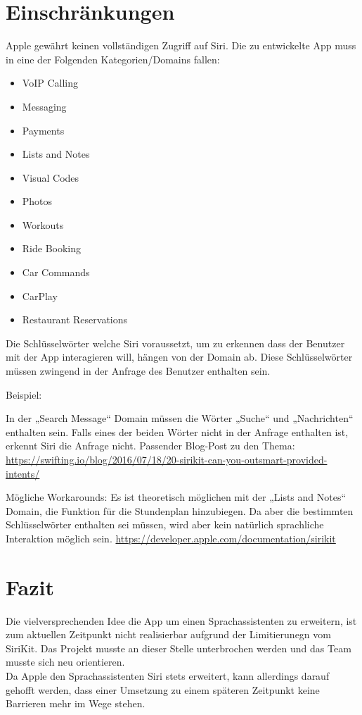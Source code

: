 \section{Einschränkungen}

Apple gewährt keinen vollständigen Zugriff auf Siri. Die zu entwickelte App muss in eine der Folgenden Kategorien/Domains fallen:
\begin{itemize}
\item VoIP Calling 
\item Messaging
\item Payments
\item Lists and Notes
\item Visual Codes
\item Photos
\item Workouts
\item Ride Booking
\item Car Commands
\item CarPlay
\item Restaurant Reservations
\end{itemize}

\newpage

Die Schlüsselwörter welche Siri voraussetzt, um zu erkennen dass der Benutzer mit der App interagieren will, hängen von der Domain ab.
Diese Schlüsselwörter müssen zwingend in der Anfrage des Benutzer enthalten sein. 

Beispiel: 

In der „Search Message“  Domain müssen die Wörter „Suche“ und „Nachrichten“ enthalten sein. Falls eines der beiden Wörter nicht in der Anfrage enthalten ist, erkennt Siri die Anfrage nicht.  \newline
Passender Blog-Post zu den Thema: \newline
\url{https://swifting.io/blog/2016/07/18/20-sirikit-can-you-outsmart-provided-intents/}

Mögliche Workarounds: \newline
Es ist theoretisch möglichen mit der „Lists and Notes“ Domain, die Funktion für die Stundenplan hinzubiegen. Da aber die bestimmten Schlüsselwörter enthalten sei müssen, wird aber kein natürlich sprachliche Interaktion möglich sein.
\url{https://developer.apple.com/documentation/sirikit}

\section{Fazit}
Die vielversprechenden Idee die App um einen Sprachassistenten zu erweitern, ist zum aktuellen Zeitpunkt nicht realisierbar aufgrund der Limitierunegn vom SiriKit. Das Projekt musste an dieser Stelle unterbrochen werden und das Team musste sich neu orientieren.\\
Da Apple den Sprachassistenten Siri stets erweitert, kann allerdings darauf gehofft werden, dass einer Umsetzung zu einem späteren Zeitpunkt keine Barrieren mehr im Wege stehen.